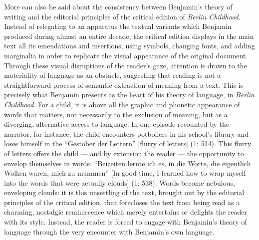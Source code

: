 \begin{review}
More can also be said about the consistency between Benjamin's theory of
writing and the editorial principles of the critical edition of
\emph{Berlin Childhood}. Instead of relegating to an apparatus the
textual variants which Benjamin produced during almost an entire decade,
the critical edition displays in the main text all its emendations and
insertions, using symbols, changing fonts, and adding marginalia in
order to replicate the visual appearance of the original document.
Through these visual disruptions of the reader's gaze, attention is
drawn to the materiality of language as an obstacle, suggesting that
reading is not a straightforward process of semantic extraction of
meaning from a text. This is precisely what Benjamin presents as the
heart of his theory of language, in \emph{Berlin Childhood}. For a
child, it is above all the graphic and phonetic appearance of words that
matters, not necessarily to the exclusion of meaning, but as a
diverging, alternative access to language. In one episode recounted by
the narrator, for instance, the child encounters potboilers in his
school's library and loses himself in the ``Gestöber der Lettern''
{[}flurry of letters{]} (1: 514). This flurry of letters offers the
child --- and by extension the reader --- the opportunity to envelop
themselves in words: ``Beizeiten lernte ich es, in die Worte, die
eigentlich Wolken waren, mich zu mummen'' {[}In good time, I learned how
to wrap myself into the words that were actually clouds{]} (1: 538).
Words become nebulous, enveloping clouds: it is this unsettling of the
text, brought out by the editorial principles of the critical edition,
that forecloses the text from being read as a charming, nostalgic
reminiscence which merely entertains or delights the reader with its
style. Instead, the reader is forced to engage with Benjamin's theory of
language through the very encounter with Benjamin's own language.


\end{review}
